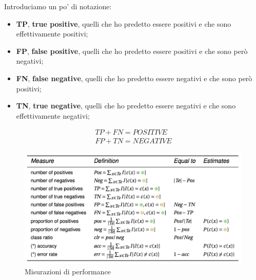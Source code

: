 \newpage

Introduciamo un po' di notazione:
\begin{itemize}
    \item \textbf{TP}, \textbf{true positive}, quelli che ho predetto essere positivi e che sono effettivamente positivi;
    \item \textbf{FP}, \textbf{false positive}, quelli che ho predetto essere positivi e che sono però negativi;
    \item \textbf{FN}, \textbf{false negative}, quelli che ho predetto essere negativi e che sono però positivi;
    \item \textbf{TN}, \textbf{true negative}, quelli che ho predetto essere negativi e che sono effettivamente negativi;
\end{itemize}

\begin{equation}
\begin{split}
    TP+FN=POSITIVE  \\
    FP+TN=NEGATIVE
\end{split}
\end{equation}

\begin{figure}[!h]
    \centering
    \includegraphics[scale=0.7]{images/measures.png}
    \caption{Misurazioni di performance}
    \label{fig:enter-label}
\end{figure}

\newpage

